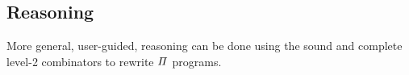 \subsection{Reasoning}

More general, user-guided, reasoning can be done using the sound and complete level-2 combinators to rewrite $\mathit{\Pi}$
programs.









